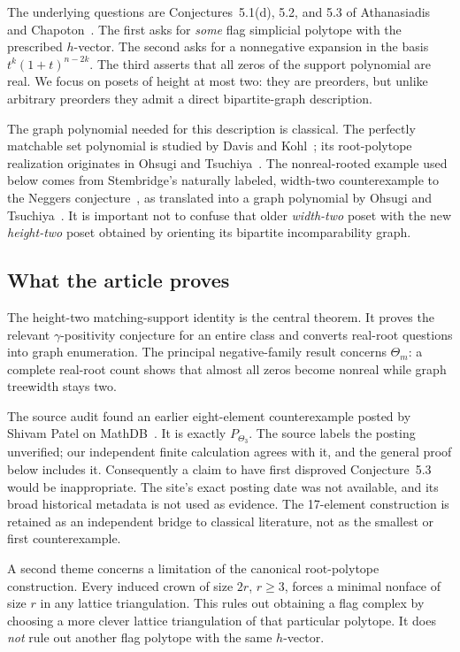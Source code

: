 \documentclass[11pt]{article}
\numberwithin{equation}{section}
\theoremstyle{definition}
\begin{document}
The underlying questions are Conjectures~5.1(d), 5.2, and 5.3 of
Athanasiadis and Chapoton~\cite{AC}. The first asks for \emph{some} flag
simplicial polytope with the prescribed $h$-vector. The second asks for a
nonnegative expansion in the basis $t^k(1+t)^{n-2k}$. The third asserts that
all zeros of the support polynomial are real. We focus on posets of height
at most two: they are preorders, but unlike arbitrary preorders they admit
a direct bipartite-graph description.

The graph polynomial needed for this description is classical. The
perfectly matchable set polynomial is studied by Davis and Kohl~\cite{DK};
its root-polytope realization originates in Ohsugi and
Tsuchiya~\cite{OT20}. The nonreal-rooted example used below comes from
Stembridge's naturally labeled, width-two counterexample to the
Neggers conjecture~\cite{Stembridge}, as translated into a graph polynomial
by Ohsugi and Tsuchiya~\cite[Example~3.7]{OT20}. It is important not to
confuse that older \emph{width-two} poset with the new \emph{height-two}
poset obtained by orienting its bipartite incomparability graph.

\subsection{What the article proves}

The height-two matching-support identity is the central theorem. It proves
the relevant $\gamma$-positivity conjecture for an entire class and converts
real-root questions into graph enumeration. The principal negative-family
result concerns $\Theta_m$: a complete real-root count shows that almost
all zeros become nonreal while graph treewidth stays two.

The source audit found an earlier eight-element counterexample posted by
Shivam Patel on MathDB~\cite{Patel}. It is exactly $P_{\Theta_3}$.
The source labels the posting unverified; our independent finite
calculation agrees with it, and the general proof below includes it.
Consequently a claim to have first disproved Conjecture~5.3 would be
inappropriate. The site's exact posting date was not available, and its
broad historical metadata is not used as evidence. The 17-element
construction is retained as an independent bridge to classical literature,
not as the smallest or first counterexample.

A second theme concerns a limitation of the canonical root-polytope
construction. Every induced crown of size $2r$, $r\ge3$, forces a minimal
nonface of size $r$ in any lattice triangulation. This rules out obtaining a
flag complex by choosing a more clever lattice triangulation of that
particular polytope. It does \emph{not} rule out another flag polytope with
the same $h$-vector.
\end{document}
